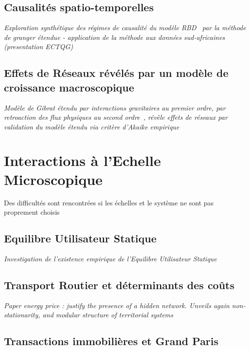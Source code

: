 \subsection{Causalités spatio-temporelles}


\textit{Exploration synthétique des régimes de causalité du modèle RBD~\cite{raimbault2014hybrid} par la méthode de granger étendue - application de la méthode aux données sud-africaines (presentation ECTQG)}


\subsection{Effets de Réseaux révélés par un modèle de croissance macroscopique}

\textit{Modèle de Gibrat étendu par interactions gravitaires au premier ordre, par retroaction des flux physiques au second ordre~\cite{raimbault2016models}, révèle effets de réseaux par validation du modèle étendu via critère d'Akaike empirique} 




\section{Interactions à l'Echelle Microscopique}

{\color{blue}Des difficultés sont rencontrées si les échelles et le système ne sont pas proprement choisis}

\subsection{Equilibre Utilisateur Statique}

\textit{Investigation de l'existence empirique de l'Equilibre Utilisateur Statique~\cite{raimbault2016investigating}}


\subsection{Transport Routier et déterminants des coûts}

\textit{Paper energy price : justify the presence of a hidden network. Unveils again non-stationarity, and modular structure of territorial systems}



\subsection{Transactions immobilières et Grand Paris}

